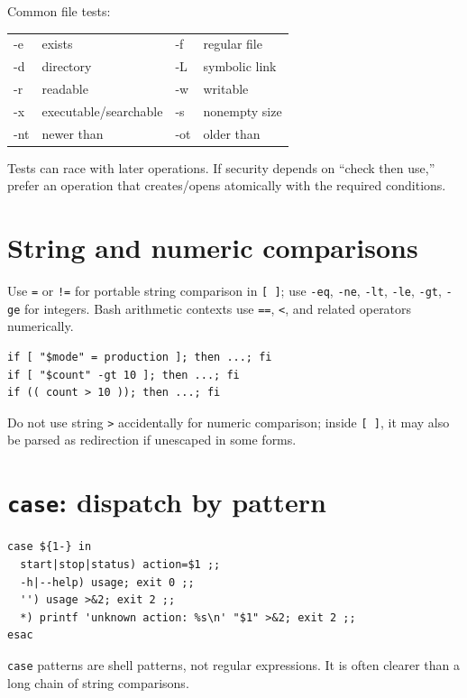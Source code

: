 \documentclass[11pt,oneside,openany]{book}
\begin{document}
Common file tests:
\begin{center}
\begin{tabularx}{0.94\textwidth}{>{\ttfamily}p{}X >{\ttfamily}p{}X}
\toprule
-e & exists & -f & regular file \\
-d & directory & -L & symbolic link \\
-r & readable & -w & writable \\
-x & executable/searchable & -s & nonempty size \\
-nt & newer than & -ot & older than \\
\bottomrule
\end{tabularx}
\end{center}
Tests can race with later operations. If security depends on “check then use,” prefer an operation that creates/opens atomically with the required conditions.

\section{String and numeric comparisons}
Use \texttt{=} or \texttt{!=} for portable string comparison in \texttt{[ ]}; use \texttt{-eq}, \texttt{-ne}, \texttt{-lt}, \texttt{-le}, \texttt{-gt}, \texttt{-ge} for integers. Bash arithmetic contexts use \texttt{==}, \texttt{<}, and related operators numerically.

\begin{lstlisting}
if [ "$mode" = production ]; then ...; fi
if [ "$count" -gt 10 ]; then ...; fi
if (( count > 10 )); then ...; fi
\end{lstlisting}
Do not use string \texttt{>} accidentally for numeric comparison; inside \texttt{[ ]}, it may also be parsed as redirection if unescaped in some forms.

\section{\texttt{case}: dispatch by pattern}
\begin{lstlisting}
case ${1-} in
  start|stop|status) action=$1 ;;
  -h|--help) usage; exit 0 ;;
  '') usage >&2; exit 2 ;;
  *) printf 'unknown action: %s\n' "$1" >&2; exit 2 ;;
esac
\end{lstlisting}
\texttt{case} patterns are shell patterns, not regular expressions. It is often clearer than a long chain of string comparisons.
\end{document}
